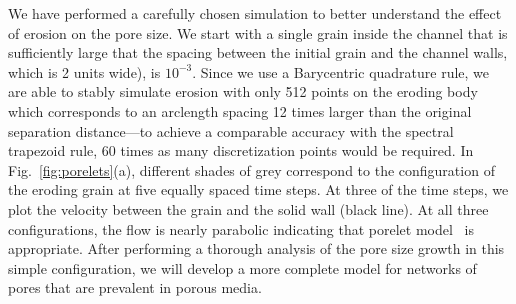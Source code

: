 \documentclass[11pt]{article}
\begin{document}
We have performed a carefully chosen simulation to better understand the
effect of erosion on the pore size. We start with a single grain inside
the channel that is sufficiently large that the spacing between the
initial grain and the channel walls, which is 2 units wide), is
$10^{-3}$. Since we use a Barycentric quadrature rule, we are able to
stably simulate erosion with only 512 points on the eroding body which
corresponds to an arclength spacing 12 times larger than the original
separation distance---to achieve a comparable accuracy with the spectral
trapezoid rule, 60 times as many discretization points would be
required. In Fig.~\ref{fig:porelets}(a), different shades of grey
correspond to the configuration of the eroding grain at five equally
spaced time steps. At three of the time steps, we plot the velocity
between the grain and the solid wall (black line). At all three
configurations, the flow is nearly parabolic indicating that  porelet
model~\cite{dea-qua-bir-jua2018} is appropriate. After performing a
thorough analysis of the pore size growth in this simple configuration,
we will develop a more complete model for networks of pores that are
prevalent in porous media.
\end{document}
